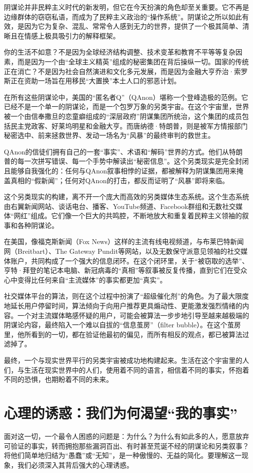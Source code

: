 阴谋论并非民粹主义时代的新发明，但它在今天扮演的角色却至关重要。它不再是边缘群体的窃窃私语，而成为了民粹主义政治的“操作系统”。阴谋论之所以如此有效，是因为它为复杂、混乱、常常令人感到无力的世界，提供了一个极其简单、清晰且在情感上极具吸引力的解释框架。

你的生活不如意？不是因为全球经济结构调整、技术变革和教育不平等等复杂因素，而是因为一个由“全球主义精英”组成的秘密集团在背后操纵一切。国家的传统正在消亡？不是因为社会自然演进和文化多元发展，而是因为金融大亨乔治·索罗斯正在资助一场旨在用移民“大置换”本土人口的邪恶计划。

在所有这些阴谋论中，美国的“匿名者Q”（QAnon）堪称一个登峰造极的范例。它已经不是一个单一的阴谋论，而是一个包罗万象的另类宇宙。在这个宇宙里，世界被一个由信奉撒旦的恋童癖组成的“深层政府”阴谋集团所统治，这个集团的成员包括民主党政客、好莱坞明星和金融大亨。而唐纳德·特朗普，则是被军方情报部门秘密选中、前来拯救世界、发动一场名为“风暴”的最终审判的救世主。

QAnon的信徒们拥有自己的一套“事实”、术语和“解码”世界的方式。他们从特朗普的每一次拼写错误、每一个手势中解读出“秘密信息”。这个另类现实是完全封闭且能够自我强化的：任何与QAnon叙事相悖的证据，都被解释为阴谋集团用来掩盖真相的“假新闻”；任何对QAnon的打击，都反而证明了“风暴”即将来临。

这个另类现实的构建，离不开一个庞大而高效的另类媒体生态系统。这个生态系统由右翼新闻网站、谈话电台、播客、YouTube频道、Facebook群组和无数社交媒体“网红”组成。它们像一个巨大的共鸣腔，不断地放大和重复着民粹主义领袖的叙事和各种阴谋论。

在美国，像福克斯新闻（Fox News）这样的主流有线电视频道，与布莱巴特新闻网（Breitbart）、The Gateway Pundit等网站，以及无数保守派意见领袖的社交媒体账户，共同构成了一个强大的信息闭环。在这个闭环里，关于“被窃取的选举”、亨特·拜登的笔记本电脑、新冠病毒的“真相”等叙事被反复传播，直到它们在受众心中变得比任何来自“主流媒体”的事实都更加“真实”。

社交媒体平台的算法，则在这个过程中扮演了“超级催化剂”的角色。为了最大限度地延长用户停留时间，算法倾向于向用户推荐更具煽动性、更能激发强烈情绪的内容。一个对主流媒体略感怀疑的用户，可能会被算法一步步地引导至越来越极端的阴谋论内容，最终陷入一个难以自拔的“信息茧房”（filter bubble）。在这个茧房里，他所看到的一切，都在验证他最初的偏见，而所有相反的观点，都已被算法过滤掉了。

最终，一个与现实世界平行的另类宇宙被成功地构建起来。生活在这个宇宙里的人们，与生活在现实世界中的人们，使用着不同的语言，相信着不同的事实，怀抱着不同的恐惧，也期盼着不同的未来。

\section{心理的诱惑：我们为何渴望“我的事实”}
面对这一切，一个最令人困惑的问题是：为什么？为什么有如此多的人，愿意放弃可验证的事实，转而拥抱那些漏洞百出、有时甚至荒诞不经的阴谋论和另类叙事？将他们简单地归结为“愚蠢”或“无知”，是一种傲慢的、无益的简化。要理解这一现象，我们必须深入其背后强大的心理诱惑。

